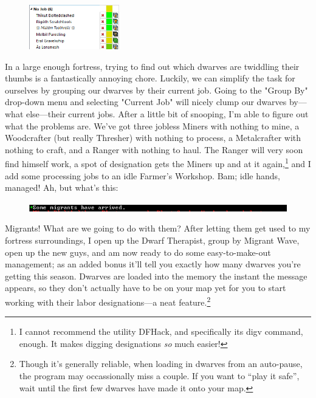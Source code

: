 \documentclass[]{article}
\begin{document}
\begin{figure}
\vspace{-20pt}
  \begin{center}
    \includegraphics[width=0.35\textwidth]{Sec2Fig7}
  \end{center}
\vspace{-10pt}
\end{figure}
In a large enough fortress, trying to find out which dwarves are twiddling their thumbs is a
fantastically annoying chore. Luckily, we can simplify the task for ourselves by grouping our dwarves by
their current job. Going to the "Group By" drop-down menu and selecting "Current Job" will nicely clump
our dwarves by---what else---their current jobs. After a little bit of snooping, I'm able to figure out
what the problems are. We've got three jobless Miners with nothing to mine, a Woodcrafter (but really
Thresher) with nothing to process, a Metalcrafter with nothing to craft, and a Ranger with nothing to
haul. The Ranger will very soon find himself work, a spot of designation gets the Miners up and at it
again,\footnote{I cannot recommend the utility DFHack, and specifically its digv command, enough. It
makes digging designations \emph{so} much easier!} and I add some processing jobs to an idle Farmer's
Workshop. Bam; idle hands, managed! Ah, but what's this:

\begin{figure}[h!]
\centering
\includegraphics[width=\linewidth]{Sec2Fig8}
\end{figure}

Migrants! What are we going to do with them? After letting them get used to my fortress surroundings, I
open up the Dwarf Therapist, group by Migrant Wave, open up the new guys, and am now ready to do some
easy-to-make-out management; as an added bonus it'll tell you exactly how many dwarves you're getting
this season. Dwarves are loaded into the memory the instant the message appears, so they
don't actually have to be on your map yet for you to start working with their labor designations---a
neat feature.\footnote{Though it's generally reliable, when loading in dwarves from an auto-pause, the
program may occassionally miss a couple. If you want to ``play it safe'', wait until the first few
dwarves have made it onto your map.}
\end{document}
